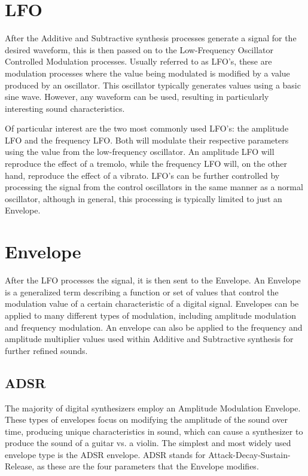 \documentclass[a4paper,12pt]{report}
\begin{document}
\section{LFO}
After the Additive and Subtractive synthesis processes generate a signal for the desired waveform, this is then passed on to the Low-Frequency Oscillator Controlled Modulation processes. Usually referred to as LFO's, these are modulation processes where the value being modulated is modified by a value produced by an oscillator. This oscillator typically generates values using a basic sine wave. However, any waveform can be used, resulting in particularly interesting sound characteristics.

Of particular interest are the two most commonly used LFO's: the amplitude LFO and the frequency LFO. Both will modulate their respective parameters using the value from the low-frequency oscillator. An amplitude LFO will reproduce the effect of a tremolo, while the frequency LFO will, on the other hand, reproduce the effect of a vibrato. LFO's can be further controlled by processing the signal from the control oscillators in the same manner as a normal oscillator, although in general, this processing is typically limited to just an Envelope.

\section{Envelope}
After the LFO processes the signal, it is then sent to the Envelope. An Envelope is a generalized term describing a function or set of values that control the modulation value of a certain characteristic of a digital signal. Envelopes can be applied to many different types of modulation, including amplitude modulation and frequency modulation. An envelope can also be applied to the frequency and amplitude multiplier values used within Additive and Subtractive synthesis for further refined sounds.

\subsection{ADSR}
The majority of digital synthesizers employ an Amplitude Modulation Envelope. These types of envelopes focus on modifying the amplitude of the sound over time, producing unique characteristics in sound, which can cause a synthesizer to produce the sound of a guitar vs. a violin. The simplest and most widely used envelope type is the ADSR envelope. ADSR stands for Attack-Decay-Sustain-Release, as these are the four parameters that the Envelope modifies.
\end{document}
